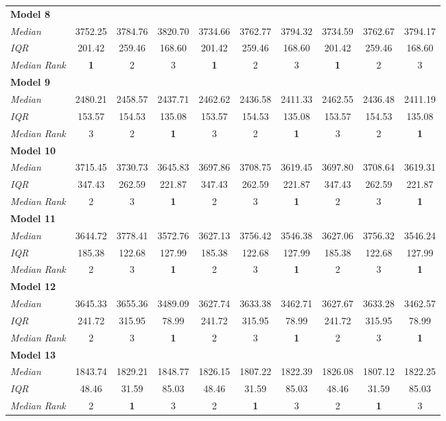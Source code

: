 \documentclass[fleqn,usenatbib]{mnras}
\begin{document}
\begin{table}
\begin{tabular}{@{\extracolsep{3pt}}lccccccccc@{}}
    \textbf{Model 8} & & & & & & & & & \\
    \emph{Median} & 3752.25 & 3784.76 & 3820.70 & 3734.66 & 3762.77 & 3794.32 & 3734.59 & 3762.67 & 3794.17 \\
    \emph{IQR} & 201.42 & 259.46 & 168.60 & 201.42 & 259.46 & 168.60 & 201.42 & 259.46 & 168.60 \\
    \emph{Median Rank} & \textbf{1} & 2 & 3 & \textbf{1} & 2 & 3 & \textbf{1} & 2 & 3 \\\hline
    \textbf{Model 9} & & & & & & & & & \\
    \emph{Median} & 2480.21 & 2458.57 & 2437.71 & 2462.62 & 2436.58 & 2411.33 & 2462.55 & 2436.48 & 2411.19 \\
    \emph{IQR} & 153.57 & 154.53 & 135.08 & 153.57 & 154.53 & 135.08 & 153.57 & 154.53 & 135.08 \\
    \emph{Median Rank} & 3 & 2 & \textbf{1} & 3 & 2 & \textbf{1} & 3 & 2 & \textbf{1} \\\hline
    \textbf{Model 10} & & & & & & & & & \\
    \emph{Median} & 3715.45 & 3730.73 & 3645.83 & 3697.86 & 3708.75 & 3619.45 & 3697.80 & 3708.64 & 3619.31 \\
    \emph{IQR} & 347.43 & 262.59 & 221.87 & 347.43 & 262.59 & 221.87 & 347.43 & 262.59 & 221.87 \\
    \emph{Median Rank} & 2 & 3 & \textbf{1} & 2 & 3 & \textbf{1} & 2 & 3 & \textbf{1} \\\hline
    \textbf{Model 11} & & & & & & & & & \\
    \emph{Median} & 3644.72 & 3778.41 & 3572.76 & 3627.13 & 3756.42 & 3546.38 & 3627.06 & 3756.32 & 3546.24 \\
    \emph{IQR} & 185.38 & 122.68 & 127.99 & 185.38 & 122.68 & 127.99 & 185.38 & 122.68 & 127.99 \\
    \emph{Median Rank} & 2 & 3 & \textbf{1} & 2 & 3 & \textbf{1} & 2 & 3 & \textbf{1} \\\hline
    \textbf{Model 12} & & & & & & & & & \\
    \emph{Median} & 3645.33 & 3655.36 & 3489.09 & 3627.74 & 3633.38 & 3462.71 & 3627.67 & 3633.28 & 3462.57 \\
    \emph{IQR} & 241.72 & 315.95 & 78.99 & 241.72 & 315.95 & 78.99 & 241.72 & 315.95 & 78.99 \\
    \emph{Median Rank} & 2 & 3 & \textbf{1} & 2 & 3 & \textbf{1} & 2 & 3 & \textbf{1} \\\hline
    \textbf{Model 13} & & & & & & & & & \\
    \emph{Median} & 1843.74 & 1829.21 & 1848.77 & 1826.15 & 1807.22 & 1822.39 & 1826.08 & 1807.12 & 1822.25 \\
    \emph{IQR} & 48.46 & 31.59 & 85.03 & 48.46 & 31.59 & 85.03 & 48.46 & 31.59 & 85.03 \\
    \emph{Median Rank} & 2 & \textbf{1} & 3 & 2 & \textbf{1} & 3 & 2 & \textbf{1} & 3 \\\hline
    \end{tabular}
\end{table}
\end{document}

